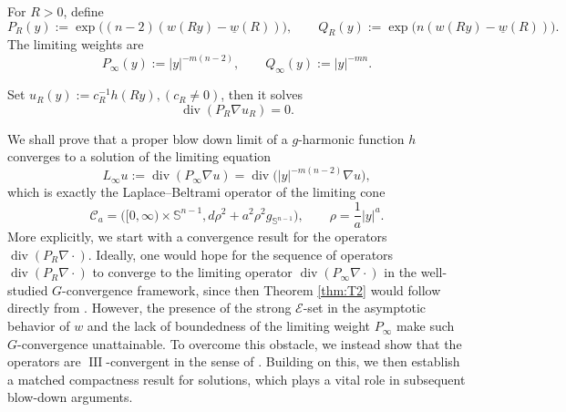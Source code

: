 \documentclass[12pt]{amsart}
\theoremstyle{plain}
\theoremstyle{definition}
\theoremstyle{remark}     %
\numberwithin{equation}{section}
\begin{document}
For $R>0$, define
\begin{equation}\label{eq:def-AR-BR}
    P_R(y):=\exp\bigl((n-2)(w(Ry)-\underline w(R))\bigr),
    \qquad
    Q_R(y):=\exp\bigl(n(w(Ry)-\underline w(R))\bigr).
\end{equation}
The limiting weights are
\[
    P_\infty(y):=|y|^{-m(n-2)},
    \qquad
    Q_\infty(y):=|y|^{-mn}.
\]


Set $u_R(y):=c_R^{-1}h(Ry), (c_R\neq 0)$, then it solves
\[
    \operatorname{div}(P_R\nabla u_R)=0.
\]

We shall prove that a proper blow down limit of a $g$-harmonic function $h$ converges to a solution of the limiting equation
\begin{equation}\label{eq:limiting-operator}
    L_\infty u
    :=\operatorname{div}(P_\infty\nabla u)
    =\operatorname{div}\bigl(|y|^{-m(n-2)}\nabla u\bigr),
\end{equation}
 which is exactly the
Laplace--Beltrami operator of the limiting cone
\begin{equation}\label{eq. def of limiting cone}
    \mathcal{C}_a=
    \bigl([0,\infty)\times\mathbb S^{n-1},
    d\rho^2+a^2\rho^2g_{\mathbb S^{n-1}}\bigr),
    \qquad \rho=\frac{1}{a}|y|^a.
\end{equation}
{More explicitly, we start with a convergence result for the operators $\operatorname{div}(P_R\nabla\cdot)$.
Ideally, one would hope for the sequence of operators  $\operatorname{div}(P_{R}\nabla\cdot)$ to converge to the limiting operator $\operatorname{div}(P_{\infty}\nabla\cdot)$ in the well-studied $G$-convergence framework, since then Theorem \ref{thm:T2} would follow directly from \cite[Theorem 2.13]{L}.
 However,  the presence of the strong $\mathcal{E}$-set in the asymptotic behavior of $w$ and the lack of boundedness of the limiting weight $P_{\infty}$ make such $G$-convergence unattainable.
 To overcome this obstacle, we instead show that the operators are $\operatorname{III}$-convergent 
in the sense of \cite[Page 76]{ZKON}. 
Building on this, we then establish a matched compactness result for solutions, which plays a vital role in subsequent blow-down arguments.}
\end{document}
